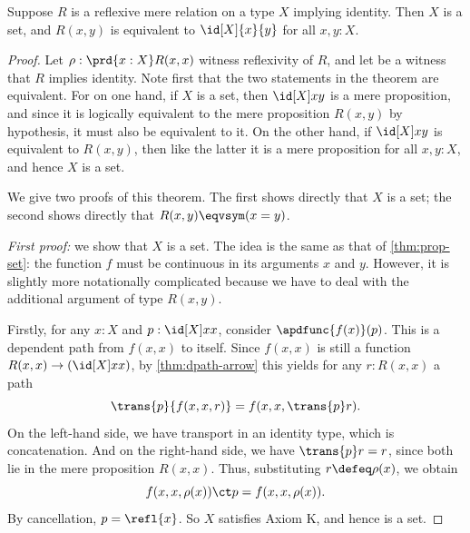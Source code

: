 %
\begin{thm}\label{thm:h-set-refrel-in-paths-sets}
  Suppose $R$ is a reflexive mere relation on a type $X$ implying identity.
  Then $X$ is a set, and $R(x,y)$ is equivalent to $\id[X]{x}{y}$ for all $x,y:X$.
\end{thm}

\begin{proof}
  Let $\rho : \prd{x:X} R(x,x)$ witness reflexivity of $R$, and let  be a witness that $R$
implies identity.
  Note first that the two statements in the theorem are equivalent.
  For on one hand, if $X$ is a set, then $\id[X]xy$ is a mere proposition, and since it is logically equivalent to the mere proposition
$R(x,y)$ by hypothesis, it must also be equivalent to it.
  On the other hand, if $\id[X]xy$ is equivalent to $R(x,y)$, then like the latter it is a mere proposition for all $x,y:X$, and hence $X$
is a set.

  We give two proofs of this theorem.
  The first shows directly that $X$ is a set; the second shows directly that $R(x,y)\eqvsym (x=y)$.

  \emph{First proof:} we show that $X$ is a set.
  The idea is the same as that of \cref{thm:prop-set}: the function $f$ must be continuous in its arguments $x$ and $y$.
  However, it is slightly more notationally complicated because we have to deal with the additional argument of type $R(x,y)$.

  Firstly, for any $x:X$ and $p:\id[X]xx$, consider $\apdfunc{f(x)}(p)$.
  This is a dependent path from $f(x,x)$ to itself.
  Since $f(x,x)$ is still a function $R(x,x) \to (\id[X]xx)$, by \cref{thm:dpath-arrow} this yields for any $r:R(x,x)$ a path
  \[\trans{p}{f(x,x,r)} = f(x,x,\trans{p}r).
  \]
  On the left-hand side, we have transport in an identity type, which is concatenation.
  And on the right-hand side, we have $\trans{p}r = r$, since both lie in the mere proposition $R(x,x)$.
  Thus, substituting $r\defeq \rho(x)$, we obtain
  \[ f(x,x,\rho(x)) \ct p = f(x,x,\rho(x)). \]
  By cancellation, $p=\refl{x}$.
  So $X$ satisfies Axiom K, and hence is a set.


\end{proof}
